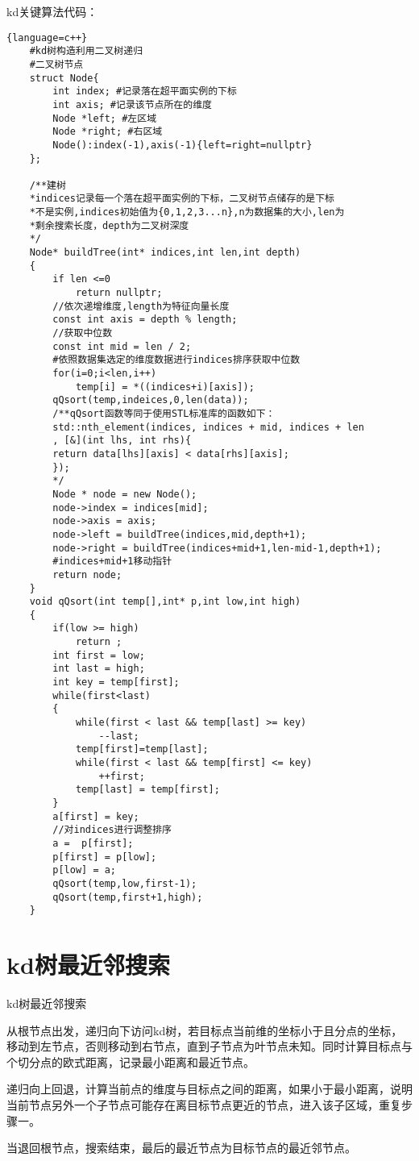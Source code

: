 \documentclass{article}
\begin{document}
	\noindent kd关键算法代码：
	\begin{lstlisting}{language=c++}
	#kd树构造利用二叉树递归
	#二叉树节点
	struct Node{
		int index; #记录落在超平面实例的下标
		int axis; #记录该节点所在的维度
		Node *left; #左区域
		Node *right; #右区域
		Node():index(-1),axis(-1){left=right=nullptr}
	};
	
	/**建树
	*indices记录每一个落在超平面实例的下标，二叉树节点储存的是下标
	*不是实例,indices初始值为{0,1,2,3...n},n为数据集的大小,len为
	*剩余搜索长度，depth为二叉树深度
	*/
	Node* buildTree(int* indices,int len,int depth)
	{
		if len <=0 
			return nullptr;
		//依次递增维度,length为特征向量长度
		const int axis = depth % length;
		//获取中位数
		const int mid = len / 2;
		#依照数据集选定的维度数据进行indices排序获取中位数
		for(i=0;i<len,i++)
			temp[i] = *((indices+i)[axis]);
		qQsort(temp,indeices,0,len(data));
		/**qQsort函数等同于使用STL标准库的函数如下：
		std::nth_element(indices, indices + mid, indices + len
		, [&](int lhs, int rhs){
		return data[lhs][axis] < data[rhs][axis];
		});
		*/
		Node * node = new Node();
		node->index = indices[mid];
		node->axis = axis;
		node->left = buildTree(indices,mid,depth+1);
		node->right = buildTree(indices+mid+1,len-mid-1,depth+1);
		#indices+mid+1移动指针
		return node;
	}	
	void qQsort(int temp[],int* p,int low,int high)
	{
		if(low >= high)
			return ;
		int first = low;
		int last = high;
		int key = temp[first];
		while(first<last)
		{
			while(first < last && temp[last] >= key)
				--last;
			temp[first]=temp[last];
			while(first < last && temp[first] <= key)
				++first;
			temp[last] = temp[first];
		}
		a[first] = key;
		//对indices进行调整排序
		a =  p[first];
		p[first] = p[low];
		p[low] = a;
		qQsort(temp,low,first-1);
		qQsort(temp,first+1,high);
	}
	\end{lstlisting}
	

	\section{kd树最近邻搜索}
	
		\begin{algorithm}
		\caption{kd树最近邻搜索}
		\LinesNumbered
		从根节点出发，递归向下访问kd树，若目标点当前维的坐标小于且分点的坐标，移动到左节点，否则移动到右节点，直到子节点为叶节点未知。同时计算目标点与个切分点的欧式距离，记录最小距离和最近节点。
		
		递归向上回退，计算当前点的维度与目标点之间的距离，如果小于最小距离，说明当前节点另外一个子节点可能存在离目标节点更近的节点，进入该子区域，重复步骤一。
		
		当退回根节点，搜索结束，最后的最近节点为目标节点的最近邻节点。
	\end{algorithm}
	
\end{document}
